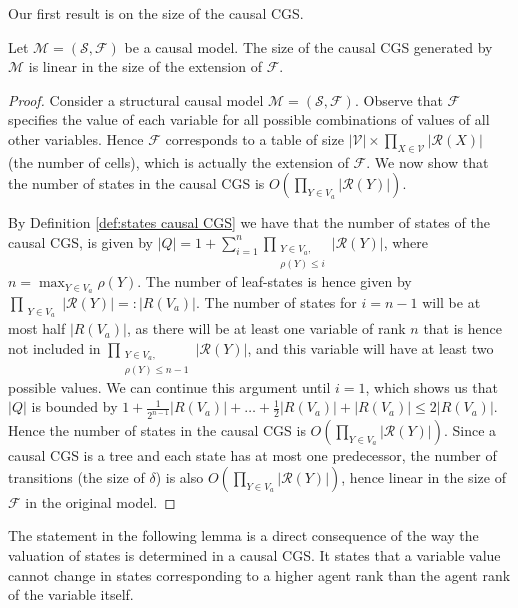 Our first result is on the size of the causal CGS.
\begin{proposition}
Let $\mathcal{M} = (\mathcal{S},\mathcal{F})$ be a causal model. The size of the causal CGS generated by $\mathcal{M}$ is linear in the size of the extension of $\mathcal{F}$.
\end{proposition}
\begin{proof}
Consider a structural causal model $\mathcal{M} = (\mathcal{S},\mathcal{F})$. Observe that $\mathcal{F}$ specifies the value of each variable for all possible combinations of values of all other variables. Hence $\mathcal{F}$ corresponds to a table of size $|\mathcal{V}| \times \prod_{X \in \mathcal{V}} |\mathcal{R}(X)|$ (the number of cells), which is actually the extension of $\mathcal{F}$. We now show that the number of states in the causal CGS is $O( \prod_{Y \in V_a} |\mathcal{R}(Y)|)$.

By Definition \ref{def:states causal CGS} we have that the number of states of the causal CGS, is given by $|Q| = 1+ \sum_{i = 1}^{n} \prod_{\substack{Y \in V_a,\\ \rho(Y) \leq i}} |\mathcal{R}(Y)|$, where $n = \max_{Y\in V_a} \rho(Y)$. The number of leaf-states is hence given by $\prod_{\substack{Y \in V_a}} |\mathcal{R}(Y)| =: |R(V_a)|$.
The number of states for $i = n-1$ will be at most half $|R(V_a)|$, as there will be at least one variable of rank $n$ that is hence not included in $\prod_{\substack{Y \in V_a,\\ \rho(Y) \leq n-1}} |\mathcal{R}(Y)|$, and this variable will have at least two possible values. We can continue this argument until $i = 1$, which shows us that $|Q|$ is bounded by $1 + \frac{1}{2^{n-1}} |R(V_a)|+\dots +\frac{1}{2} |R(V_a)|+|R(V_a)| \leq 2 |R(V_a)|$. 
Hence the number of states in the causal CGS is $O( \prod_{Y \in V_a} |\mathcal{R}(Y)|)$.
Since a causal CGS is a tree and each state has at most one predecessor, the number of transitions (the size of $\delta$) is also 
$O( \prod_{Y \in V_a} |\mathcal{R}(Y)|)$, hence linear in the size of $\mathcal{F}$ in the original model.
\end{proof}


The statement in the following lemma is a direct consequence of the way the valuation of states is determined in a causal CGS. It states that a variable value cannot change in states corresponding to a higher agent rank than the agent rank of the variable itself.

